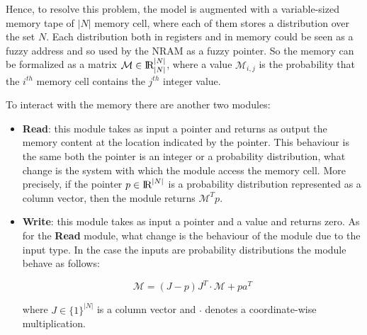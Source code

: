 Hence, to resolve this problem, the model is augmented with a variable-sized memory tape of $|N|$ memory cell, where each of them stores a distribution over the set $N$. Each distribution both in registers and in memory could be seen as a fuzzy address and so used by the NRAM as a fuzzy pointer. So the memory can be formalized as a matrix $\mathcal{M} \in \textrm{I\!R}_{|N|}^{|N|}$, where a value $\mathcal{M}_{i,j}$ is the probability that the $i^{th}$ memory cell contains the $j^{th}$ integer value.

To interact with the memory there are another two modules:
\begin{itemize}
	\item{\textbf{Read}: this module takes as input a pointer and returns as output the memory content at the location indicated by the pointer. This behaviour is the same both the pointer is an integer or a probability distribution, what change is the system with which the module access the memory cell. More precisely, if the pointer $p\in\textrm{I\!R}^{|N|}$ is a probability distribution represented as a column vector, then the module returns $\mathcal{M}^{T}p$.}
	\item{\textbf{Write}: this module takes as input a pointer and a value and returns zero. As for the \textbf{Read} module,  what change is the behaviour of the module due to the input type. In the case the inputs are probability distributions the module behave as follows:
\begin{center}
	\begin{equation}
	\mathcal{M} = (J - p)J^{T} \cdot \mathcal{M} + pa^{T}
	\end{equation}
\end{center}	
where $J \in \{1\}^{|N|}$ is a column vector and $\cdot$ denotes a coordinate-wise multiplication.
}
\end{itemize}